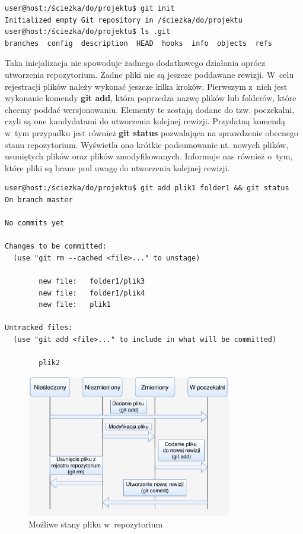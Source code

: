 \begin{lstlisting}[language=bash,language=Cmd,caption={Inicjalizacja repozytorium git}]
user@host:/ścieżka/do/projektu$ git init
Initialized empty Git repository in /ściezka/do/projektu
user@host:/ściezka/do/projektu$ ls .git
branches  config  description  HEAD  hooks  info  objects  refs
\end{lstlisting}

Taka inicjalizacja nie spowoduje żadnego dodatkowego działania oprócz utworzenia repozytorium. Żadne pliki nie są jeszcze poddawane rewizji. W~celu rejestracji plików należy wykonać jeszcze kilka kroków. Pierwszym z~nich jest wykonanie komendy \textbf{git add}, która poprzedza nazwę plików lub folderów, które chcemy poddać wersjonowaniu. Elementy te zostają dodane do tzw. poczekalni, czyli są one kandydatami do utworzenia kolejnej rewizji. Przydatną komendą w~tym przypadku jest również \textbf{git status} pozwalająca na sprawdzenie obecnego stanu repozytorium. Wyświetla ono krótkie podsumowanie nt. nowych plików, usuniętych plików oraz plików zmodyfikowanych. Informuje nas również o~tym, które pliki są brane pod uwagę do utworzenia kolejnej rewizji.

\begin{lstlisting}[language=Cmd,caption={Dodawanie elementów do poczekalni}]
user@host:/ściezka/do/projektu$ git add plik1 folder1 && git status
On branch master

No commits yet

Changes to be committed:
  (use "git rm --cached <file>..." to unstage)

        new file:   folder1/plik3
        new file:   folder1/plik4
        new file:   plik1

Untracked files:
  (use "git add <file>..." to include in what will be committed)

        plik2
\end{lstlisting}

\begin{figure}[H]
\centering
\includegraphics[width=0.8\textwidth]{res/fileStates.pdf}
\caption{Możliwe stany pliku w~repozytorium \cite{GitChart}} 
\end{figure}

